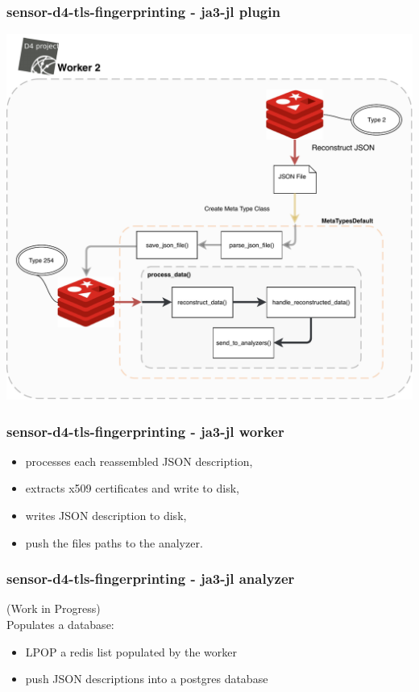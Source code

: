 \documentclass{beamer}
\begin{document}
\begin{frame}
        \frametitle{sensor-d4-tls-fingerprinting - ja3-jl plugin} 
              \begin{center}
                \includegraphics[scale=0.4]{d4-worker2-ja3-jl.pdf}
              \end{center}
\end{frame}

\begin{frame}[fragile]
        \frametitle{sensor-d4-tls-fingerprinting - ja3-jl worker} 
        
        \begin{itemize}
          \item processes each reassembled JSON description,
          \item extracts x509 certificates and write to disk,
          \item writes JSON description to disk,
          \item push the files paths to the analyzer.
        \end{itemize}
\end{frame}

\begin{frame}[fragile]
        \frametitle{sensor-d4-tls-fingerprinting - ja3-jl analyzer} 
        (Work in Progress) \\
        \vspace{.8cm} 
        Populates a database:
        \begin{itemize}
          \item LPOP a redis list populated by the worker
          \item push JSON descriptions into a postgres database
        \end{itemize}
\end{frame}
\end{document}

